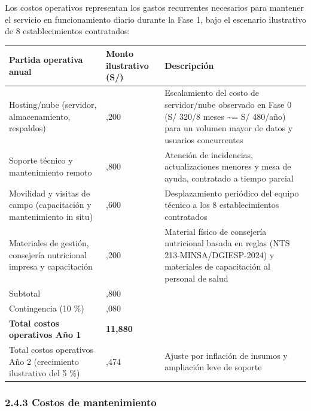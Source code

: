 \documentclass[11pt,a4paper]{article}
\begin{document}
Los costos operativos representan los gastos recurrentes necesarios para mantener el servicio en funcionamiento diario durante la Fase 1, bajo el escenario ilustrativo de 8 establecimientos contratados:

{\small
\begin{longtable}[]{@{}
  >{\raggedright\arraybackslash}p{}
  >{\raggedright\arraybackslash}p{}
  >{\raggedright\arraybackslash}p{}@{}}
\toprule\noalign{}
\begin{minipage}[b]{\linewidth}\raggedright
Partida operativa anual
\end{minipage} & \begin{minipage}[b]{\linewidth}\raggedright
Monto ilustrativo (S/)
\end{minipage} & \begin{minipage}[b]{\linewidth}\raggedright
Descripción
\end{minipage} \\
\midrule\noalign{}
\endhead
\bottomrule\noalign{}
\endlastfoot
Hosting/nube (servidor, almacenamiento, respaldos) & 1,200 & Escalamiento del costo de servidor/nube observado en Fase 0 (S/ 320/8 meses \textasciitilde= S/ 480/año) para un volumen mayor de datos y usuarios concurrentes \\
Soporte técnico y mantenimiento remoto & 4,800 & Atención de incidencias, actualizaciones menores y mesa de ayuda, contratado a tiempo parcial \\
Movilidad y visitas de campo (capacitación y mantenimiento in situ) & 3,600 & Desplazamiento periódico del equipo técnico a los 8 establecimientos contratados \\
Materiales de gestión, consejería nutricional impresa y capacitación & 1,200 & Material físico de consejería nutricional basada en reglas (NTS 213-MINSA/DGIESP-2024) y materiales de capacitación al personal de salud \\
Subtotal & 10,800 & \\
Contingencia (10 \%) & 1,080 & \\
\textbf{Total costos operativos Año 1} & \textbf{11,880} & \\
Total costos operativos Año 2 (crecimiento ilustrativo del 5 \%) & 12,474 & Ajuste por inflación de insumos y ampliación leve de soporte \\
\end{longtable}
}

\subsubsection{2.4.3 Costos de mantenimiento}\label{costos-de-mantenimiento}
\end{document}
